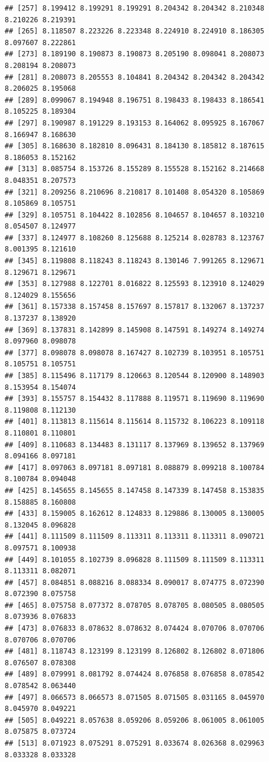 \documentclass[
]{article}
\begin{document}
\begin{verbatim}
## [257] 8.199412 8.199291 8.199291 8.204342 8.204342 8.210348 8.210226 8.219391
## [265] 8.118507 8.223226 8.223348 8.224910 8.224910 8.186305 8.097607 8.222861
## [273] 8.189190 8.190873 8.190873 8.205190 8.098041 8.208073 8.208194 8.208073
## [281] 8.208073 8.205553 8.104841 8.204342 8.204342 8.204342 8.206025 8.195068
## [289] 8.099067 8.194948 8.196751 8.198433 8.198433 8.186541 8.105225 8.189304
## [297] 8.190987 8.191229 8.193153 8.164062 8.095925 8.167067 8.166947 8.168630
## [305] 8.168630 8.182810 8.096431 8.184130 8.185812 8.187615 8.186053 8.152162
## [313] 8.085754 8.153726 8.155289 8.155528 8.152162 8.214668 8.048351 8.207573
## [321] 8.209256 8.210696 8.210817 8.101408 8.054320 8.105869 8.105869 8.105751
## [329] 8.105751 8.104422 8.102856 8.104657 8.104657 8.103210 8.054507 8.124977
## [337] 8.124977 8.108260 8.125688 8.125214 8.028783 8.123767 8.001395 8.121610
## [345] 8.119808 8.118243 8.118243 8.130146 7.991265 8.129671 8.129671 8.129671
## [353] 8.127988 8.122701 8.016822 8.125593 8.123910 8.124029 8.124029 8.155656
## [361] 8.157338 8.157458 8.157697 8.157817 8.132067 8.137237 8.137237 8.138920
## [369] 8.137831 8.142899 8.145908 8.147591 8.149274 8.149274 8.097960 8.098078
## [377] 8.098078 8.098078 8.167427 8.102739 8.103951 8.105751 8.105751 8.105751
## [385] 8.115496 8.117179 8.120663 8.120544 8.120900 8.148903 8.153954 8.154074
## [393] 8.155757 8.154432 8.117888 8.119571 8.119690 8.119690 8.119808 8.112130
## [401] 8.113813 8.115614 8.115614 8.115732 8.106223 8.109118 8.110801 8.110801
## [409] 8.110683 8.134483 8.131117 8.137969 8.139652 8.137969 8.094166 8.097181
## [417] 8.097063 8.097181 8.097181 8.088879 8.099218 8.100784 8.100784 8.094048
## [425] 8.145655 8.145655 8.147458 8.147339 8.147458 8.153835 8.158885 8.160808
## [433] 8.159005 8.162612 8.124833 8.129886 8.130005 8.130005 8.132045 8.096828
## [441] 8.111509 8.111509 8.113311 8.113311 8.113311 8.090721 8.097571 8.100938
## [449] 8.101055 8.102739 8.096828 8.111509 8.111509 8.113311 8.113311 8.082071
## [457] 8.084851 8.088216 8.088334 8.090017 8.074775 8.072390 8.072390 8.075758
## [465] 8.075758 8.077372 8.078705 8.078705 8.080505 8.080505 8.073936 8.076833
## [473] 8.076833 8.078632 8.078632 8.074424 8.070706 8.070706 8.070706 8.070706
## [481] 8.118743 8.123199 8.123199 8.126802 8.126802 8.071806 8.076507 8.078308
## [489] 8.079991 8.081792 8.074424 8.076858 8.076858 8.078542 8.078542 8.063440
## [497] 8.066573 8.066573 8.071505 8.071505 8.031165 8.045970 8.045970 8.049221
## [505] 8.049221 8.057638 8.059206 8.059206 8.061005 8.061005 8.075875 8.073724
## [513] 8.071923 8.075291 8.075291 8.033674 8.026368 8.029963 8.033328 8.033328

\end{verbatim}
\end{document}
